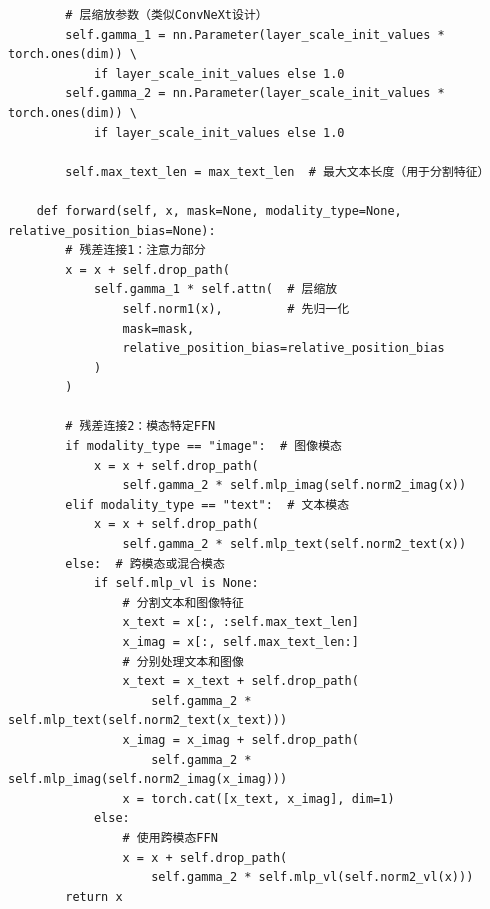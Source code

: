 \documentclass[zihao=false,fontset=windows]{ctexart}
\begin{document}
\begin{feishucode}
\begin{lstlisting}
        # 层缩放参数（类似ConvNeXt设计）
        self.gamma_1 = nn.Parameter(layer_scale_init_values * torch.ones(dim)) \
            if layer_scale_init_values else 1.0
        self.gamma_2 = nn.Parameter(layer_scale_init_values * torch.ones(dim)) \
            if layer_scale_init_values else 1.0

        self.max_text_len = max_text_len  # 最大文本长度（用于分割特征）

    def forward(self, x, mask=None, modality_type=None, relative_position_bias=None):
        # 残差连接1：注意力部分
        x = x + self.drop_path(
            self.gamma_1 * self.attn(  # 层缩放
                self.norm1(x),         # 先归一化
                mask=mask,
                relative_position_bias=relative_position_bias
            )
        )

        # 残差连接2：模态特定FFN
        if modality_type == "image":  # 图像模态
            x = x + self.drop_path(
                self.gamma_2 * self.mlp_imag(self.norm2_imag(x))
        elif modality_type == "text":  # 文本模态
            x = x + self.drop_path(
                self.gamma_2 * self.mlp_text(self.norm2_text(x))
        else:  # 跨模态或混合模态
            if self.mlp_vl is None:
                # 分割文本和图像特征
                x_text = x[:, :self.max_text_len]
                x_imag = x[:, self.max_text_len:]
                # 分别处理文本和图像
                x_text = x_text + self.drop_path(
                    self.gamma_2 * self.mlp_text(self.norm2_text(x_text)))
                x_imag = x_imag + self.drop_path(
                    self.gamma_2 * self.mlp_imag(self.norm2_imag(x_imag)))
                x = torch.cat([x_text, x_imag], dim=1)
            else:
                # 使用跨模态FFN
                x = x + self.drop_path(
                    self.gamma_2 * self.mlp_vl(self.norm2_vl(x)))
        return x
\end{lstlisting}
\end{feishucode}
\end{document}
